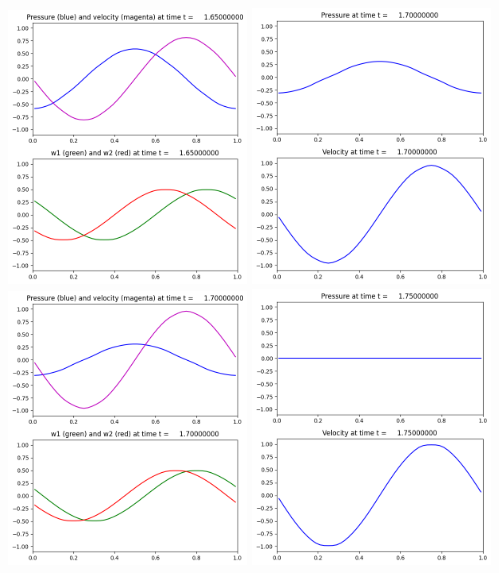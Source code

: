 \documentclass[11pt]{article}
\begin{document}
\includegraphics[width=0.475\textwidth]{frame0033fig2.png}
\vskip 10pt 
\includegraphics[width=0.475\textwidth]{frame0034fig1.png}
\includegraphics[width=0.475\textwidth]{frame0034fig2.png}
\vskip 10pt 
\includegraphics[width=0.475\textwidth]{frame0035fig1.png}
\end{document}
